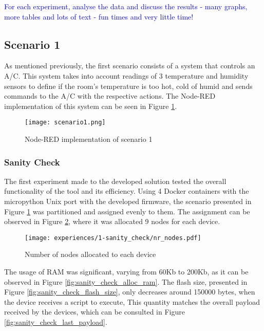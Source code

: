 \textcolor{blue}{For each experiment, analyse the data and discuss the results - many graphs, more tables and lots of text - fun times and very little time!}

\subsection{Scenario 1}\label{sec:discussion_scenario1}

As mentioned previously, the first scenario consists of a system that controls an A/C. This system takes into account readings of 3 temperature and humidity sensors to define if the room's temperature is too hot, cold of humid and sends commands to the A/C with the respective actions. The Node-RED implementation of this system can be seen in Figure \ref{fig:scenario1_node_red}.

\begin{figure}[h]
\centering
\texttt{[image: scenario1.png]}
\caption[Node-RED implementation of scenario 1]{Node-RED implementation of scenario 1}\label{fig:scenario1_node_red}
\end{figure}


\subsubsection{Sanity Check}

The first experiment made to the developed solution tested the overall functionality of the tool and its efficiency. Using 4 Docker containers with the micropython Unix port with the developed firmware, the scenario presented in Figure \ref{fig:scenario1_node_red} was partitioned and assigned evenly to them. The assignment can be observed in Figure \ref{fig:sanity_check_nr_nodes}, where it was allocated 9 nodes for each device.

\begin{figure}[h]
\centering
\texttt{[image: experiences/1-sanity\_check/nr\_nodes.pdf]}
\caption[Number of nodes allocated to each device]{Number of nodes allocated to each device}\label{fig:sanity_check_nr_nodes}
\end{figure}

The usage of RAM was significant, varying from 60Kb to 200Kb, as it can be observed in Figure \ref{fig:sanity_check_alloc_ram}. The flash size, presented in Figure \ref{fig:sanity_check_flash_size}, only decreases around 150000 bytes, when the device receives a script to execute, This quantity matches the overall payload received by the devices, which can be consulted in Figure \ref{fig:sanity_check_last_payload}.

